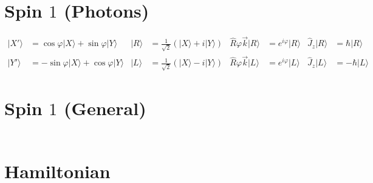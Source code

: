 \documentclass{article}
\newcommand{\ket}[1]{\ensuremath{\mid#1\rangle}}
\newcommand{\op}[1]{\ensuremath{\hat#1}}
\begin{document}
	\section*{Spin $1$ (Photons)}
	\begin{align*}
		\ket{X'}&=\cos\varphi\ket{X}+\sin\varphi\ket{Y} &
		\ket{R}&=\frac{1}{\sqrt{2}}(\ket{X}+i\ket{Y}) &
		\op{R\varphi\vec{k}}\ket{R}&=e^{i\varphi}\ket{R} &
		\op{J_z}\ket{R}&=\hbar\ket{R} \\
		\ket{Y'}&=-\sin\varphi\ket{X}+\cos\varphi\ket{Y} &
		\ket{L}&=\frac{1}{\sqrt{2}}(\ket{X}-i\ket{Y}) &
		\op{R\varphi\vec{k}}\ket{L}&=e^{i\varphi}\ket{L} &
		\op{J_z}\ket{L}&=-\hbar\ket{L}
	\end{align*}
	\section*{Spin $1$ (General)}
	\begin{align*}
	\end{align*}
	\section*{Hamiltonian}
	\begin{align*}
	\end{align*}
\end{document}
